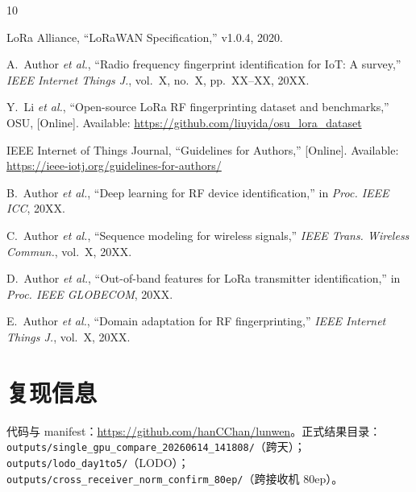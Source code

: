 \documentclass[journal]{IEEEtran}
\begin{document}
\balance
\begin{thebibliography}{10}

LoRa Alliance, ``LoRaWAN Specification,'' v1.0.4, 2020.

A.~Author \emph{et al.}, ``Radio frequency fingerprint identification for IoT: A survey,'' \emph{IEEE Internet Things J.}, vol.~X, no.~X, pp.~XX--XX, 20XX.

Y.~Li \emph{et al.}, ``Open-source LoRa RF fingerprinting dataset and benchmarks,'' OSU, [Online]. Available: \url{https://github.com/liuyida/osu_lora_dataset}

IEEE Internet of Things Journal, ``Guidelines for Authors,'' [Online]. Available: \url{https://ieee-iotj.org/guidelines-for-authors/}

B.~Author \emph{et al.}, ``Deep learning for RF device identification,'' in \emph{Proc. IEEE ICC}, 20XX.

C.~Author \emph{et al.}, ``Sequence modeling for wireless signals,'' \emph{IEEE Trans. Wireless Commun.}, vol.~X, 20XX.

D.~Author \emph{et al.}, ``Out-of-band features for LoRa transmitter identification,'' in \emph{Proc. IEEE GLOBECOM}, 20XX.

E.~Author \emph{et al.}, ``Domain adaptation for RF fingerprinting,'' \emph{IEEE Internet Things J.}, vol.~X, 20XX.

\end{thebibliography}

\appendices
\section{复现信息}
代码与 manifest：\url{https://github.com/hanCChan/lunwen}。正式结果目录：\\
\texttt{outputs/single\_gpu\_compare\_20260614\_141808/}（跨天）；\\
\texttt{outputs/lodo\_day1to5/}（LODO）；\\
\texttt{outputs/cross\_receiver\_norm\_confirm\_80ep/}（跨接收机 80ep）。
\end{document}
